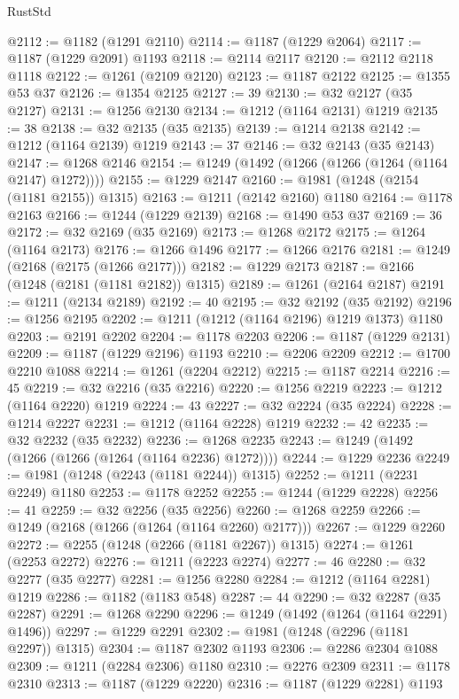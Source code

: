 \begin{lexlean}{RustStd}
\begin{coremodule}
{\begin{coremodule}
{{{{{{{{{{{{{{{{{{{{{{{{{{{{{{{{@2112 := @1182 (@1291 @2110)
@2114 := @1187 (@1229 @2064)
@2117 := @1187 (@1229 @2091) @1193
@2118 := @2114 @2117
@2120 := @2112 @2118 @1118
@2122 := @1261 (@2109 @2120)
@2123 := @1187 @2122
@2125 := @1355 @53 @37
@2126 := @1354 @2125
@2127 := 39
@2130 := @32 @2127 (@35 @2127)
@2131 := @1256 @2130
@2134 := @1212 (@1164 @2131) @1219
@2135 := 38
@2138 := @32 @2135 (@35 @2135)
@2139 := @1214 @2138
@2142 := @1212 (@1164 @2139) @1219
@2143 := 37
@2146 := @32 @2143 (@35 @2143)
@2147 := @1268 @2146
@2154 := @1249 (@1492 (@1266 (@1266 (@1264 (@1164 @2147) @1272))))
@2155 := @1229 @2147
@2160 := @1981 (@1248 (@2154 (@1181 @2155)) @1315)
@2163 := @1211 (@2142 @2160) @1180
@2164 := @1178 @2163
@2166 := @1244 (@1229 @2139)
@2168 := @1490 @53 @37
@2169 := 36
@2172 := @32 @2169 (@35 @2169)
@2173 := @1268 @2172
@2175 := @1264 (@1164 @2173)
@2176 := @1266 @1496
@2177 := @1266 @2176
@2181 := @1249 (@2168 (@2175 (@1266 @2177)))
@2182 := @1229 @2173
@2187 := @2166 (@1248 (@2181 (@1181 @2182)) @1315)
@2189 := @1261 (@2164 @2187)
@2191 := @1211 (@2134 @2189)
@2192 := 40
@2195 := @32 @2192 (@35 @2192)
@2196 := @1256 @2195
@2202 := @1211 (@1212 (@1164 @2196) @1219 @1373) @1180
@2203 := @2191 @2202
@2204 := @1178 @2203
@2206 := @1187 (@1229 @2131)
@2209 := @1187 (@1229 @2196) @1193
@2210 := @2206 @2209
@2212 := @1700 @2210 @1088
@2214 := @1261 (@2204 @2212)
@2215 := @1187 @2214
@2216 := 45
@2219 := @32 @2216 (@35 @2216)
@2220 := @1256 @2219
@2223 := @1212 (@1164 @2220) @1219
@2224 := 43
@2227 := @32 @2224 (@35 @2224)
@2228 := @1214 @2227
@2231 := @1212 (@1164 @2228) @1219
@2232 := 42
@2235 := @32 @2232 (@35 @2232)
@2236 := @1268 @2235
@2243 := @1249 (@1492 (@1266 (@1266 (@1264 (@1164 @2236) @1272))))
@2244 := @1229 @2236
@2249 := @1981 (@1248 (@2243 (@1181 @2244)) @1315)
@2252 := @1211 (@2231 @2249) @1180
@2253 := @1178 @2252
@2255 := @1244 (@1229 @2228)
@2256 := 41
@2259 := @32 @2256 (@35 @2256)
@2260 := @1268 @2259
@2266 := @1249 (@2168 (@1266 (@1264 (@1164 @2260) @2177)))
@2267 := @1229 @2260
@2272 := @2255 (@1248 (@2266 (@1181 @2267)) @1315)
@2274 := @1261 (@2253 @2272)
@2276 := @1211 (@2223 @2274)
@2277 := 46
@2280 := @32 @2277 (@35 @2277)
@2281 := @1256 @2280
@2284 := @1212 (@1164 @2281) @1219
@2286 := @1182 (@1183 @548)
@2287 := 44
@2290 := @32 @2287 (@35 @2287)
@2291 := @1268 @2290
@2296 := @1249 (@1492 (@1264 (@1164 @2291) @1496))
@2297 := @1229 @2291
@2302 := @1981 (@1248 (@2296 (@1181 @2297)) @1315)
@2304 := @1187 @2302 @1193
@2306 := @2286 @2304 @1088
@2309 := @1211 (@2284 @2306) @1180
@2310 := @2276 @2309
@2311 := @1178 @2310
@2313 := @1187 (@1229 @2220)
@2316 := @1187 (@1229 @2281) @1193
}}}}}}}}}}}}}}}}}}}}}}}}}}}}}}}}
\end{coremodule}}
\end{coremodule}
\end{lexlean}
